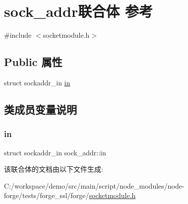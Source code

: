 \hypertarget{unionsock__addr}{}\section{sock\+\_\+addr联合体 参考}
\label{unionsock__addr}


{\ttfamily \#include $<$socketmodule.\+h$>$}

\subsection*{Public 属性}
\begin{DoxyCompactItemize}
\item 
struct sockaddr\+\_\+in \mbox{\hyperlink{unionsock__addr_a82ea25fa0cddf6b74986bff8b19e3293}{in}}
\end{DoxyCompactItemize}


\subsection{类成员变量说明}
\mbox{\label{unionsock__addr_a82ea25fa0cddf6b74986bff8b19e3293}} 
\subsubsection{\texorpdfstring{in}{in}}
{\footnotesize\ttfamily struct sockaddr\+\_\+in sock\+\_\+addr\+::in}



该联合体的文档由以下文件生成\+:\begin{DoxyCompactItemize}
\item 
C\+:/workspace/demo/src/main/script/node\+\_\+modules/node-\/forge/tests/forge\+\_\+ssl/forge/\mbox{\hyperlink{socketmodule_8h}{socketmodule.\+h}}\end{DoxyCompactItemize}
